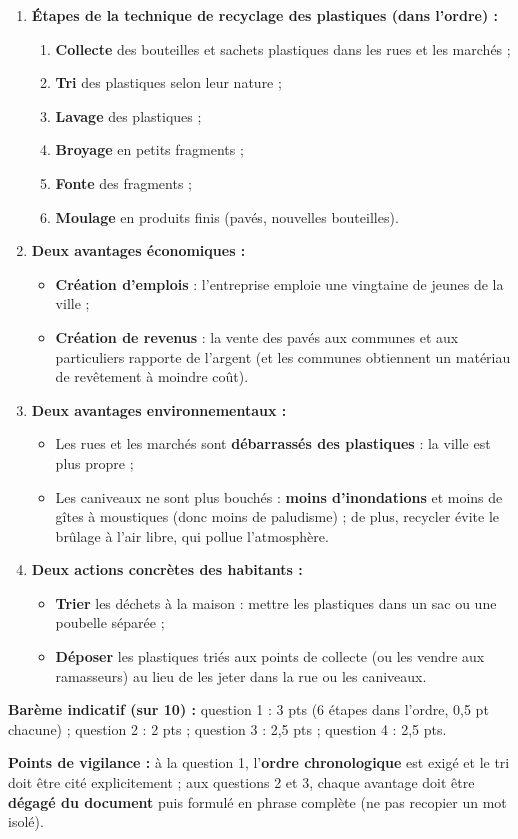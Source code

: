 \documentclass[11pt]{article}
\begin{document}
\begin{corrige}
\begin{enumerate}
\item \textbf{Étapes de la technique de recyclage des plastiques (dans l'ordre) :}
\begin{enumerate}
\item \textbf{Collecte} des bouteilles et sachets plastiques dans les rues et les marchés ;
\item \textbf{Tri} des plastiques selon leur nature ;
\item \textbf{Lavage} des plastiques ;
\item \textbf{Broyage} en petits fragments ;
\item \textbf{Fonte} des fragments ;
\item \textbf{Moulage} en produits finis (pavés, nouvelles bouteilles).
\end{enumerate}
\item \textbf{Deux avantages économiques :}
\begin{itemize}
\item \textbf{Création d'emplois} : l'entreprise emploie une vingtaine de jeunes de la ville ;
\item \textbf{Création de revenus} : la vente des pavés aux communes et aux particuliers rapporte de l'argent (et les communes obtiennent un matériau de revêtement à moindre coût).
\end{itemize}
\item \textbf{Deux avantages environnementaux :}
\begin{itemize}
\item Les rues et les marchés sont \textbf{débarrassés des plastiques} : la ville est plus propre ;
\item Les caniveaux ne sont plus bouchés : \textbf{moins d'inondations} et moins de gîtes à moustiques (donc moins de paludisme) ; de plus, recycler évite le brûlage à l'air libre, qui pollue l'atmosphère.
\end{itemize}
\item \textbf{Deux actions concrètes des habitants :}
\begin{itemize}
\item \textbf{Trier} les déchets à la maison : mettre les plastiques dans un sac ou une poubelle séparée ;
\item \textbf{Déposer} les plastiques triés aux points de collecte (ou les vendre aux ramasseurs) au lieu de les jeter dans la rue ou les caniveaux.
\end{itemize}
\end{enumerate}
\textbf{Barème indicatif (sur 10) :} question 1 : 3 pts (6 étapes dans l'ordre, 0,5 pt chacune) ; question 2 : 2 pts ; question 3 : 2,5 pts ; question 4 : 2,5 pts.
\par\textbf{Points de vigilance :} à la question 1, l'\textbf{ordre chronologique} est exigé et le tri doit être cité explicitement ; aux questions 2 et 3, chaque avantage doit être \textbf{dégagé du document} puis formulé en phrase complète (ne pas recopier un mot isolé).
\end{corrige}
\end{document}
